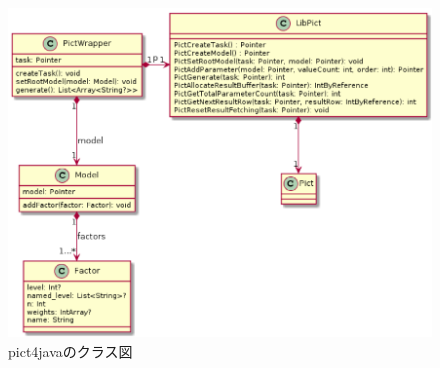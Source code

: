\documentclass[uplatex, report, a4j, 10pt]{jsbook}
\newcommand\ttt[1]{\texttt{#1}}
\begin{document}
\begin{figure}[tp]
  \centering
  \includegraphics[keepaspectratio, width=160mm]{figs/pict4java_class}
  \caption{pict4javaのクラス図}
  \label{fig:pict4javaClass}
\end{figure}

\newcommand{\PictAddParameter}{\ttt{PictAddParameter}}
\newcommand{\PictGenerate}{\ttt{PictGenerate}}
\newcommand{\PictGetNextResultRow}{\ttt{PictGetNextResultRow}}
\newcommand{\createTask}{\ttt{createTask}}
\newcommand{\setRootModel}{\ttt{setRootModel}}
\newcommand{\generate}{\ttt{generate}}
\newcommand{\addFactor}{\ttt{addFactor}}
\end{document}
